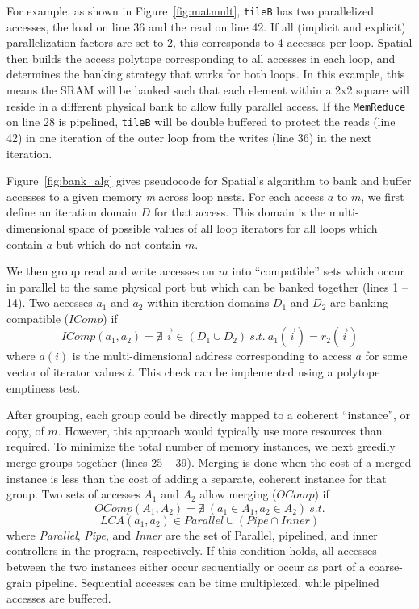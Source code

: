 For example, as shown in Figure~\ref{fig:matmult}, \texttt{\small{tileB}} has two parallelized accesses, the load on line 36 and the read on line 42. If all (implicit and explicit) parallelization factors are set to 2, this corresponds to 4 accesses per loop. Spatial then builds the access polytope corresponding to all accesses in each loop, and determines the banking strategy that works for both loops. In this example, this means the SRAM will be banked such that each element within a 2x2 square will reside
in a different physical bank to allow fully parallel access. If the \texttt{\small{MemReduce}} on line 28 is pipelined, \texttt{\small{tileB}} will be double buffered to protect the reads (line 42) in one iteration of the outer loop from the writes (line 36) in the next iteration.

Figure~\ref{fig:bank_alg} gives pseudocode for Spatial's algorithm to bank and buffer accesses to a given memory \emph{m} across loop nests. For each access $a$ to $m$, we first define an iteration domain $D$ for that access. This domain is the multi-dimensional space of possible values of all loop iterators for all loops which contain $a$ but which do not contain $m$.

We then group read and write accesses on $m$ into ``compatible'' sets which occur in parallel to the same physical port but which can be banked together (lines 1 -- 14).
Two accesses $a_1$ and $a_2$ within iteration domains $D_1$ and $D_2$
are banking compatible ($IComp$) if
\[ IComp(a_1,a_2) = \nexists~\vec{i} \in (D_1 \cup D_2) ~s.t.~a_1(\vec{i}) = r_2(\vec{i}) \]
where $a(i)$ is the multi-dimensional address corresponding to access $a$ for some vector of iterator values $i$.
This check can be implemented using a polytope emptiness test.

After grouping, each group could be directly mapped to a coherent ``instance'', or copy, of $m$.
However, this approach would typically use more resources than required. To minimize the total number of memory instances, we next greedily merge groups together (lines 25 -- 39). Merging is done when the cost of a merged instance is less than the cost of adding a separate, coherent instance for that group.
Two sets of accesses $A_1$ and $A_2$ allow merging ($OComp$) if
\[ OComp(A_1, A_2) = \nexists~ (a_1 \in A_1, a_2 \in A_2) ~s.t. \]
\[  LCA(a_1, a_2) \in Parallel \cup (Pipe \cap Inner) \]
where \emph{Parallel}, \emph{Pipe}, and \emph{Inner} are the set of Parallel, pipelined, and inner controllers in the program, respectively.
If this condition holds, all accesses between the two instances either occur sequentially or occur as part of a coarse-grain pipeline. Sequential accesses can be time multiplexed, while pipelined accesses are buffered.

